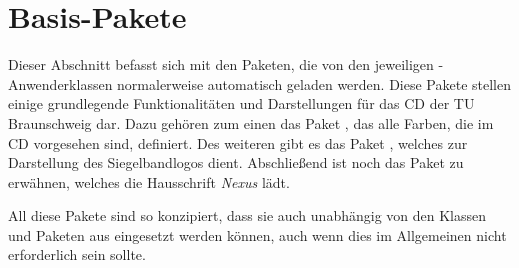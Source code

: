 \documentclass[%
  a4paper,%
  11pt,%
  twoside=false,%
  rgb,%
  extramargin,%
  parskip=half,%
]{tubsbook}
\begin{document}



\part{Basis-Pakete}

Dieser Abschnitt befasst sich mit den Paketen, die von den jeweiligen
\tubslatex-Anwenderklassen normalerweise automatisch geladen werden.
Diese Pakete stellen einige grundlegende Funktionalitäten und Darstellungen
für das \acs{CD} der TU Braunschweig dar. Dazu gehören zum einen das Paket
, das alle Farben, die im \acs{CD} vorgesehen sind,
definiert. Des weiteren gibt es das Paket , welches
zur Darstellung des Siegelbandlogos dient. Abschließend ist noch das Paket
 zu erwähnen, welches die Hausschrift \emph{Nexus}
lädt.

All diese Pakete sind so konzipiert, dass sie auch unabhängig von den
Klassen und Paketen aus \tubslatex eingesetzt werden können, auch wenn dies
im Allgemeinen nicht erforderlich sein sollte.




\appendix



\printglossary[style=altlist,title=Glossar]
\printglossary[type=\acronymtype,style=long]



\listoffigures



\end{document}
